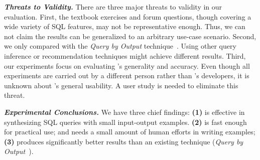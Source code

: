 \vspace{1mm}
\noindent \textbf{\textit{Threats to Validity.}}
There are three major threats to validity
in our evaluation. First, the \exnum textbook exercises
and \pnum forum questions, though covering
a wide variety of SQL features, may not be representative enough.
Thus, we can not claim the results can be generalized to an
arbitrary use-case scenario. Second, we only compared
\ourtool with the \textit{Query by Output} technique~\cite{Tran:2009}.
Using other query inference or recommendation techniques
might achieve different results. Third, our
experiments focus on evaluating \ourtool's generality 
and accuracy. Even though all experiments are carried
out by a different person rather than \ourtool's developers,
it is unknown about \ourtool's general usability.
A user study is needed to eliminate this threat.


\vspace{1mm}
\noindent \textbf{\textit{Experimental Conclusions.}}
We have three chief findings: \textbf{(1)}
\ourtool is effective in synthesizing SQL queries
with small input-output examples.
\textbf{(2)} \ourtool is fast enough for practical use;
and needs a small amount of human
efforts in writing examples;
\textbf{(3)} \ourtool produces significantly better results
than an existing technique (\textit{Query by Output}~\cite{Tran:2009}).




